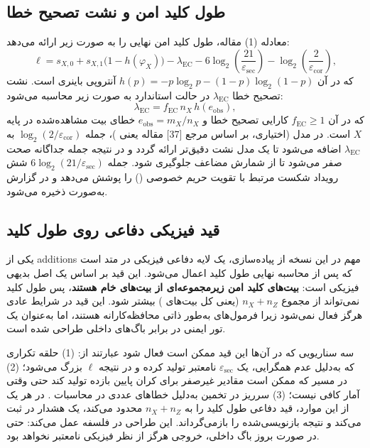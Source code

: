 \subsection{طول کلید امن و نشت تصحیح خطا}

معادله (1) مقاله، طول کلید امن نهایی را به صورت زیر ارائه می‌دهد:
\begin{equation}
	\ell = s_{X,0} + s_{X,1}\bigl(1 - h(\varphi_X)\bigr) - \lambda_{\text{EC}} - 6\log_2\!\left(\frac{21}{\varepsilon_{\text{sec}}}\right) - \log_2\!\left(\frac{2}{\varepsilon_{\text{cor}}}\right),
\end{equation}
که در آن $h(p) = -p\log_2 p - (1-p)\log_2(1-p)$ آنتروپی باینری است. نشت تصحیح خطا $\lambda_{\text{EC}}$ در حالت استاندارد به صورت زیر محاسبه می‌شود:
\begin{equation}
	\lambda_{\text{EC}} = f_{\text{EC}}\,n_X\,h(e_{\text{obs}}),
\end{equation}
که در آن $f_{\text{EC}} \ge 1$ کارایی تصحیح خطا و $e_{\text{obs}} = m_X / n_X$ خطای بیت مشاهده‌شده در پایه $X$ است. در مدل  (اختیاری، بر اساس مرجع [37] مقاله یعنی )، جمله $\log_2(2/\varepsilon_{\text{cor}})$ به $\lambda_{\text{EC}}$ اضافه می‌شود تا یک مدل نشت دقیق‌تر ارائه گردد و در نتیجه جمله جداگانه صحت صفر می‌شود تا از شمارش مضاعف جلوگیری شود. جمله $6\log_2(21/\varepsilon_{\text{sec}})$ شش رویداد شکست مرتبط با تقویت حریم خصوصی () را پوشش می‌دهد و در گزارش  به‌صورت  ذخیره می‌شود.

\subsection{قید فیزیکی دفاعی روی طول کلید}

یکی از additions مهم در این نسخه از پیاده‌سازی، یک لایه دفاعی فیزیکی در متد  است که پس از محاسبه نهایی طول کلید اعمال می‌شود. این قید بر اساس یک اصل بدیهی فیزیکی است: \textbf{بیت‌های کلید امن زیرمجموعه‌ای از بیت‌های خام  هستند}، پس طول کلید نمی‌تواند از مجموع $n_X + n_Z$ (یعنی کل بیت‌های ) بیشتر شود. این قید در شرایط عادی هرگز فعال نمی‌شود زیرا فرمول‌های  به‌طور ذاتی محافظه‌کارانه هستند، اما به‌عنوان یک تور ایمنی در برابر باگ‌های داخلی طراحی شده است.

سه سناریویی که در آن‌ها این قید ممکن است فعال شود عبارتند از: (1) حلقه  تکراری که به‌دلیل عدم همگرایی، یک $\varepsilon_{\text{sec}}$ نامعتبر تولید کرده و در نتیجه $\ell$ بزرگ می‌شود؛ (2)  در مسیر  که ممکن است مقادیر غیرصفر برای کران پایین بازده تولید کند حتی وقتی آمار کافی نیست؛ (3) سرریز در تخمین  به‌دلیل خطاهای عددی در محاسبات . در هر یک از این موارد، قید دفاعی طول کلید را به $n_X + n_Z$ محدود می‌کند، یک هشدار در  ثبت می‌کند و نتیجه بازنویسی‌شده را بازمی‌گرداند. این طراحی در فلسفه  عمل می‌کند: حتی در صورت بروز باگ داخلی، خروجی هرگز از نظر فیزیکی نامعتبر نخواهد بود.

